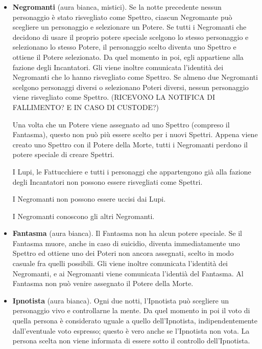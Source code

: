 \documentclass[a4paper,10pt]{article}
\begin{document}
\begin{itemize}

 \item {\bf Negromanti} (aura bianca, mistici). %
 Se la notte precedente nessun personaggio è stato risvegliato come Spettro, ciascun Negromante può scegliere un personaggio e selezionare un Potere.
 Se tutti i Negromanti che decidono di usare il proprio potere speciale scelgono lo stesso personaggio e selezionano lo stesso Potere, il personaggio scelto diventa uno Spettro e ottiene il Potere selezionato.
 Da quel momento in poi, egli appartiene alla fazione degli Incantatori. Gli viene inoltre comunicata l'identità dei Negromanti che lo hanno risvegliato come Spettro.
 Se almeno due Negromanti scelgono personaggi diversi o selezionano Poteri diversi, nessun personaggio viene risvegliato come Spettro. (RICEVONO LA NOTIFICA DI FALLIMENTO? E IN CASO DI CUSTODE?)
 
 Una volta che un Potere viene assegnato ad uno Spettro (compreso il Fantasma), questo non può più essere scelto per i nuovi Spettri. Appena viene creato uno Spettro con il Potere della Morte, tutti i Negromanti perdono il potere speciale di creare Spettri.
 
 I Lupi, le Fattucchiere e tutti i personaggi che appartengono già alla fazione degli Incantatori non possono essere risvegliati come Spettri. %

 I Negromanti non possono essere uccisi dai Lupi.

 I Negromanti conoscono gli altri Negromanti.
 
 \item {\bf Fantasma} (aura bianca). Il Fantasma non ha alcun potere speciale. Se il Fantasma muore, anche in caso di suicidio, diventa immediatamente uno Spettro ed ottiene uno dei Poteri non ancora assegnati, scelto in modo casuale fra quelli possibili. Gli viene inoltre comunicata l'identità dei Negromanti, e ai Negromanti viene comunicata l'identià del Fantasma.
 Al Fantasma non può venire assegnato il Potere della Morte.
 
 \item {\bf Ipnotista} (aura bianca). Ogni due notti, l'Ipnotista può scegliere un personaggio vivo e controllarne la mente.
 Da quel momento in poi il voto di quella persona è considerato uguale a quello dell'Ipnotista, indipendentemente dall'eventuale voto espresso; questo è vero anche se l'Ipnotista non vota.
 La persona scelta non viene informata di essere sotto il controllo dell'Ipnotista.


\end{itemize}
\end{document}
